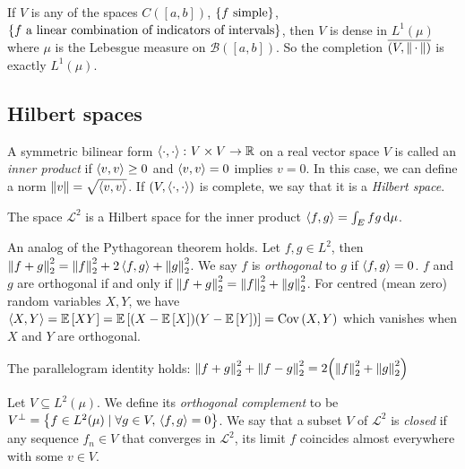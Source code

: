 \begin{remark}
	If \( V \) is any of the spaces \( C([a,b]) \), \( \qty{f \text{ simple}} \), \( \qty{f \text{ a linear combination of indicators of intervals}} \), then \( V \) is dense in \( L^1(\mu) \) where \( \mu \) is the Lebesgue measure on \( \mathcal B([a,b]) \).
	So the completion \( \overline{(V,\norm{\,\cdot\,})} \) is exactly \( L^1(\mu) \).
\end{remark}

\subsection{Hilbert spaces}
\begin{definition}
	A symmetric bilinear form \( \left\langle{\cdot, \cdot}\right\rangle \colon V \times V \to \mathbb R \) on a real vector space \( V \) is called an \emph{inner product} if \( \left\langle{v,v}\right\rangle \geq 0 \) and \( \left\langle{v,v}\right\rangle = 0 \) implies \( v = 0 \).
	In this case, we can define a norm \( \norm{v} = \sqrt{\left\langle{v,v}\right\rangle} \).
	If \( (V,\left\langle{\cdot,\cdot}\right\rangle) \) is complete, we say that it is a \emph{Hilbert space}.
\end{definition}
\begin{corollary}
	The space \( \mathcal L^2 \) is a Hilbert space for the inner product \( \left\langle{f,g}\right\rangle = \int_E fg \dd{\mu} \).
\end{corollary}
\begin{example}
	An analog of the Pythagorean theorem holds.
	Let \( f, g \in L^2 \), then \( \norm{f + g}_2^2 = \norm{f}_2^2 + 2\left\langle{f,g}\right\rangle + \norm{g}_2^2 \).
	We say \( f \) is \emph{orthogonal} to \( g \) if \( \left\langle{f,g}\right\rangle = 0 \).
	\( f \) and \( g \) are orthogonal if and only if \( \norm{f + g}_2^2 = \norm{f}_2^2 + \norm{g}_2^2 \).
	For centred (mean zero) random variables \( X, Y \), we have \( \left\langle{X,Y}\right\rangle = \mathbb{E}\left[{XY}\right] = \mathbb{E}\left[{(X - \mathbb{E}\left[{X}\right])(Y - \mathbb{E}\left[{Y}\right])}\right] = \operatorname{Cov}\left({X,Y}\right) \) which vanishes when \( X \) and \( Y \) are orthogonal.
\end{example}
\begin{example}
	The parallelogram identity holds: \( \norm{f+g}_2^2 + \norm{f-g}_2^2 = 2 \qty(\norm{f}_2^2 + \norm{g}_2^2) \)
\end{example}
\begin{definition}
	Let \( V \subseteq L^2(\mu) \).
	We define its \emph{orthogonal complement} to be \( V^\perp = \qty{f \in L^2(\mu) \mid \forall g \in V,\, \left\langle{f,g}\right\rangle = 0} \).
	We say that a subset \( V \) of \( \mathcal L^2 \) is \emph{closed} if any sequence \( f_n \in V \) that converges in \( \mathcal L^2 \), its limit \( f \) coincides almost everywhere with some \( v \in V \).
\end{definition}
